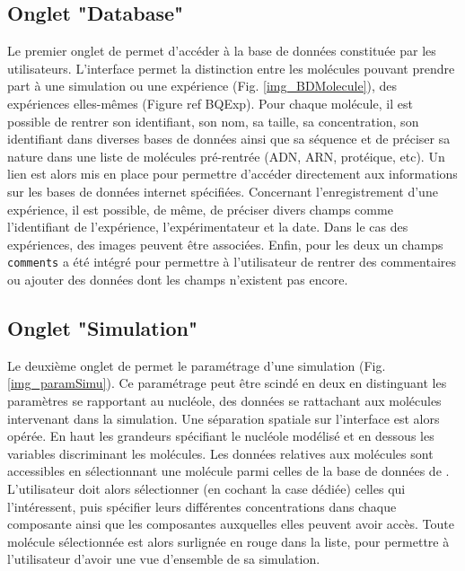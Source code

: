 \subsection{Onglet "Database"}



Le premier onglet de \NQ permet d'accéder à la base de données
constituée par les utilisateurs. L'interface permet la distinction
entre les molécules pouvant prendre part à une simulation ou une
expérience (Fig. \ref{img_BDMolecule}), des expériences elles-mêmes
(Figure ref BQExp). Pour chaque molécule, il est possible de rentrer
son identifiant, son nom, sa taille, sa concentration, son identifiant
dans diverses bases de données ainsi que sa séquence et de préciser sa
nature dans une liste de molécules pré-rentrée (ADN, ARN, protéique,
etc). Un lien est alors mis en place pour permettre d'accéder
directement aux informations sur les bases de données internet
spécifiées. Concernant l'enregistrement d'une expérience, il est
possible, de même, de préciser divers champs comme l'identifiant de
l'expérience, l'expérimentateur et la date. Dans le cas des
expériences, des images peuvent être associées. Enfin, pour les deux
un champs \og{} \texttt{comments} \fg{} a été intégré pour permettre à
l'utilisateur de rentrer des commentaires ou ajouter des données dont
les champs n'existent pas encore.

\subsection{Onglet "Simulation"}

Le deuxième onglet de \NQ permet le paramétrage d'une simulation
(Fig. \ref{img_paramSimu}). Ce paramétrage peut être scindé en deux en
distinguant les paramètres se rapportant au nucléole, des données se
rattachant aux molécules intervenant dans la simulation. Une
séparation spatiale sur l'interface est alors opérée. En haut les
grandeurs spécifiant le nucléole modélisé et en dessous les variables
discriminant les molécules. Les données relatives aux molécules sont
accessibles en sélectionnant une molécule parmi celles de la base de
données de \NQ. L'utilisateur doit alors sélectionner (en cochant la
case dédiée) celles qui l'intéressent, puis spécifier leurs
différentes concentrations dans chaque composante ainsi que les
composantes auxquelles elles peuvent avoir accès. Toute molécule
sélectionnée est alors surlignée en rouge dans la liste, pour
permettre à l'utilisateur d'avoir une vue d'ensemble de sa simulation.

